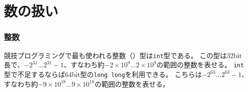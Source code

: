 \begin{comment}
\section{Working with numbers}

\index{integer}

\subsubsection{Integers}
\end{comment}

\section{数の扱い}


\subsubsection{整数}

\begin{comment}
The most used integer type in competitive programming
is \texttt{int}, which is a 32-bit type with
a value range of $-2^{31} \ldots 2^{31}-1$
or about $-2 \times 10^9 \ldots 2 \times 10^9$.
If the type \texttt{int} is not enough,
the 64-bit type \texttt{long long} can be used.
It has a value range of $-2^{63} \ldots 2^{63}-1$
or about $-9 \times 10^{18} \ldots 9 \times 10^{18}$.

The following code defines a
\texttt{long long} variable:
\begin{lstlisting}
long long x = 123456789123456789LL;
\end{lstlisting}
The suffix \texttt{LL} means that the
type of the number is \texttt{long long}.

A common mistake when using the type \texttt{long long}
is that the type \texttt{int} is still used somewhere
in the code.
For example, the following code contains
a subtle error:
\end{comment}

競技プログラミングで最も使われる整数（）型は\texttt{int}型である。
この型は32bit長で、$-2^{31} \ldots 2^{31}-1$、すなわち約$-2 \times 10^9 \ldots 2 \times 10^9$の範囲の整数を表せる。
\texttt{int}型で不足するならば64bit型の\texttt{long long}を利用できる。
こちらは$-2^{63} \ldots 2^{63}-1$、すなわち約$-9 \times 10^{18} \ldots 9 \times 10^{18}$の範囲の整数を表せる。

